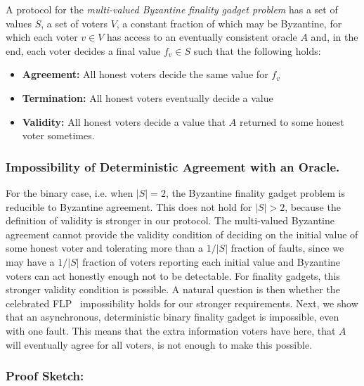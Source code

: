 \documentclass[a4paper,UKenglish,cleveref, autoref, thm-restate, anonymous]{lipics-v2019}
\begin{document}
\begin{definition} A protocol for the {\em multi-valued Byzantine finality gadget problem} has a set of values $S$, a set of voters $V$, a constant fraction of which may be Byzantine, for which each voter $v \in V$ has access to an eventually consistent oracle $A$ and, in the end, each voter decides a final value $f_v \in S$ such that the following holds:

\begin{itemize}
\item {\bf Agreement:} All honest voters decide the same value for $f_v$
\item {\bf Termination:} All honest voters eventually decide a value
\item {\bf Validity:} All honest voters decide a value that $A$ returned to some honest voter sometimes.
\end{itemize}

\end{definition}

\subsubsection{Impossibility of Deterministic Agreement with an Oracle.}\label{ssec:impossibility}

For the binary case, i.e. when $|S|=2$, the Byzantine finality gadget problem is reducible to Byzantine agreement. This does not hold for $|S| > 2$, because the definition of validity is stronger in our protocol. The multi-valued Byzantine agreement cannot provide the validity condition of deciding on the initial value of some honest voter and tolerating more than a $1/|S|$ fraction of faults, since we may have a $1/|S|$ fraction of voters reporting each initial value and Byzantine voters can act honestly enough not to be detectable. For finality gadgets, this stronger validity condition is possible. A natural question is then whether the celebrated FLP~\cite{fischer85impossibility} impossibility holds for our stronger requirements.
Next, we show that an asynchronous, deterministic binary finality gadget is impossible, even with one fault. 
This means that the extra information voters have here, that $A$ will eventually agree for all voters, is not enough to make this possible.


\subsubsection{Proof Sketch:}
\end{document}
